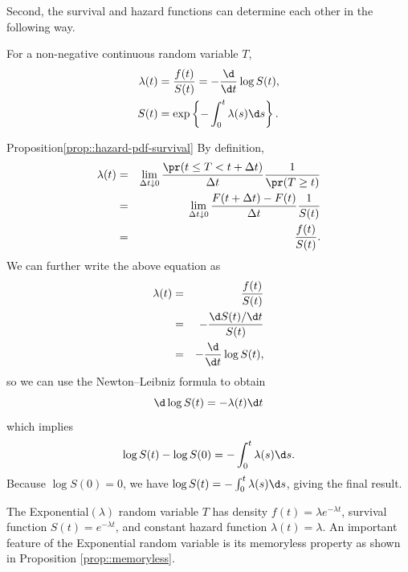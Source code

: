 Second, the survival and hazard functions can determine each other in the following way.

\begin{proposition}\label{prop::hazard-pdf-survival}
For a non-negative continuous random variable $T$, 
\begin{align*}
\lambda(t) & =\frac{f(t)}{S(t)} = -\frac{\d}{\d t}\log S(t),\\
S(t) & =\exp\left\{ -\int_{0}^{t}\lambda(s)\d s\right\} .
\end{align*}
\end{proposition}



\begin{myproof}{Proposition}{\ref{prop::hazard-pdf-survival}}
By definition,
\begin{eqnarray*}
\lambda(t) &=&\lim_{\Delta t\downarrow0}\frac{\pr(t\leq T<t+\Delta t)}{\Delta t}\frac{1}{\pr(T\geq t)}  \\
&=&\lim_{\Delta t\downarrow0}\frac{F(t+\Delta t)-F(t)}{\Delta t}\frac{1}{S(t)}\\
&=&\frac{f(t)}{S(t)}.
\end{eqnarray*}
We can further write the above equation as
\begin{eqnarray*}
\lambda(t)  &=& \frac{f(t)}{S(t)} \\
&=& -\frac{\d S(t)/\d t}{S(t)} \\
&=&  -\frac{\d}{\d t}\log S(t),
\end{eqnarray*}
so we can use the Newton--Leibniz formula to obtain
\[
\d\log S(t)=-\lambda(t)\d t
\]
which implies
\[
\log S(t) - \log S(0)=-\int_{0}^{t}\lambda(s)\d s . 
\]
Because $\log S(0)=0$, we have $\log S(t) = -\int_{0}^{t}\lambda(s)\d s$, giving the final result. 
\end{myproof}


\begin{example}
[Exponential]
The Exponential$(\lambda)$ random variable $T$ has density $f(t) = \lambda e^{-\lambda t}$, survival function $S(t) = e^{-\lambda t}$, and constant hazard function
$
\lambda(t)= \lambda.
$
An important feature of the Exponential random variable is its memoryless property as shown in Proposition \ref{prop::memoryless}. 
\end{example}



